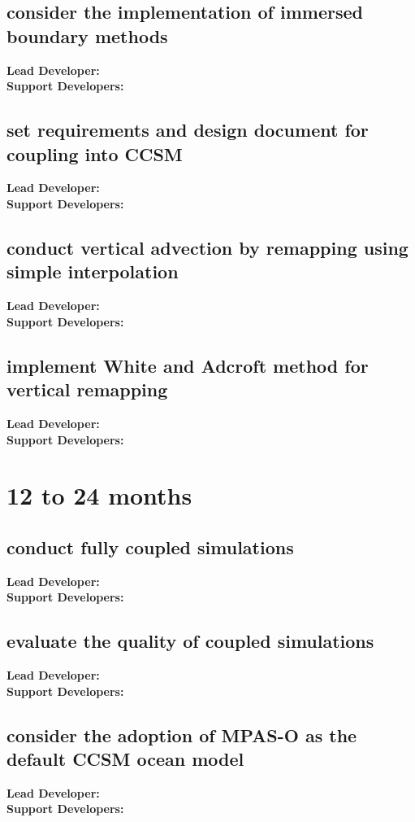 \subsection{consider the implementation of immersed boundary methods}
{\bf Lead Developer:  } \\
{\bf Support Developers: } \\
\subsection{set requirements and design document for coupling into CCSM}
{\bf Lead Developer:  } \\
{\bf Support Developers: } \\
\subsection{conduct vertical advection by remapping using simple interpolation}
{\bf Lead Developer:  } \\
{\bf Support Developers: } \\
\subsection{implement White and Adcroft method for vertical remapping}
{\bf Lead Developer:  } \\
{\bf Support Developers: } \\


\section{12 to 24 months}
\subsection{conduct fully coupled simulations}
{\bf Lead Developer:  } \\
{\bf Support Developers: } \\
\subsection{evaluate the quality of coupled simulations}
{\bf Lead Developer:  } \\
{\bf Support Developers: } \\
\subsection{consider the adoption of MPAS-O as the default CCSM ocean model}
{\bf Lead Developer:  } \\
{\bf Support Developers: } \\
